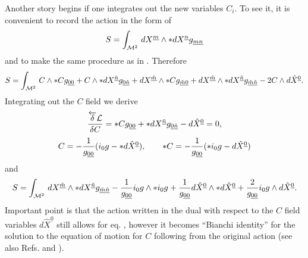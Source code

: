 \documentclass[a4paper,11pt]{article}
\begin{document}
Another story begins if one integrates out the new variables $C_i$. To see
it, it is convenient to record the action  in the form of
\begin{equation}\plabel{SA1F}
S=\int_{{\cal M}^2}\, dX^{\underline m}\wedge \ast dX^{\underline n}
g_{\underline{mn}}
\end{equation}
and to make the same procedure as in . Therefore
\begin{equation}\plabel{SA2F}
S=\int_{{\cal M}^2}\, C\wedge \ast C g_{\underline{00}}+
C\wedge \ast dX^{\underline{\tilde n}}g_{\underline{0}\underline{\tilde
n}}+dX^{\underline{\tilde m}}\wedge \ast C g_{\underline{\tilde m}
\underline{0}}+dX^{\underline{\tilde m}}\wedge \ast
dX^{\underline{\tilde n}}g_{\underline{\tilde m}\underline{\tilde n}}
-2C\wedge d{\hat X}^{\underline{0}}.
\end{equation}
Integrating out the $C$ field we derive
$$
{\overleftarrow{ \delta}{\cal L}\over \delta C}=\ast C
g_{\underline{00}}+\ast dX^{\underline{\tilde
n}}g_{\underline{0}\underline{\tilde n}}- d{\hat
X}^{\underline{0}}=0,
$$
\begin{equation}\plabel{A1}
C=-{1\over g_{\underline{00}}}(i_0 g-\ast d{\hat X}^{\underline{0}}),
\qquad
\ast C=-{1\over g_{\underline{00}}}(\ast i_0 g-d{\hat
X}^{\underline{0}})
\end{equation}
and
\begin{equation}\plabel{A2}
S=\int_{{\cal M}^2}\, dX^{\underline{\tilde m}}\wedge \ast
dX^{\underline{\tilde n}}g_{\underline{\tilde m}\underline{\tilde n}}
-{1\over g_{\underline{00}}}i_0 g\wedge \ast i_0 g+{1\over
g_{\underline{00}}} d{\hat X}^{\underline 0}\wedge \ast d{\hat
X}^{\underline 0} +{2\over g_{\underline{00}}}i_0 g \wedge d{\hat
X}^{\underline 0}.
\end{equation}
Important point is that the action  written in the dual with respect to
the $C$ field variables $d{\hat X}^{\underline 0}$ still allows for eq. ,
however it becomes ``Bianchi identity'' for the solution to the equation 
of motion for $C$ following from the original action \cite{hklr} 
(see also Refs. \cite{duff} and \cite{hl}).
\end{document}
